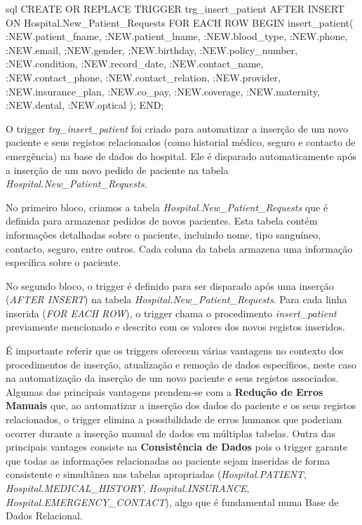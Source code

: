 \begin{myminted}{sql}
CREATE OR REPLACE TRIGGER trg_insert_patient
AFTER INSERT ON Hospital.New_Patient_Requests
FOR EACH ROW
BEGIN
    insert_patient(
        :NEW.patient_fname,
        :NEW.patient_lname,
        :NEW.blood_type,
        :NEW.phone,
        :NEW.email,
        :NEW.gender,
        :NEW.birthday,
        :NEW.policy_number,
        :NEW.condition,
        :NEW.record_date,
        :NEW.contact_name,
        :NEW.contact_phone,
        :NEW.contact_relation,
        :NEW.provider,
        :NEW.insurance_plan,
        :NEW.co_pay,
        :NEW.coverage,
        :NEW.maternity,
        :NEW.dental,
        :NEW.optical
    );
END;
\end{myminted}

O trigger \textit{trg\_insert\_patient} foi criado para automatizar a inserção de um novo paciente e seus registos relacionados (como historial médico, seguro e contacto de emergência) na base de dados do hospital. Ele é disparado automaticamente após a inserção de um novo pedido de paciente na tabela \textit{Hospital.New\_Patient\_Requests}.

No primeiro bloco, criamos a tabela \textit{Hospital.New\_Patient\_Requests} que é definida para armazenar pedidos de novos pacientes. Esta tabela contém informações detalhadas sobre o paciente, incluindo nome, tipo sanguíneo, contacto, seguro, entre outros. Cada coluna da tabela armazena uma informação específica sobre o paciente.

No segundo bloco, o trigger é definido para ser disparado após uma inserção (\textit{AFTER INSERT}) na tabela \textit{Hospital.New\_Patient\_Requests}. Para cada linha inserida (\textit{FOR EACH ROW}), o trigger chama o procedimento \textit{insert\_patient} previamente mencionado e descrito com os valores dos novos registos inseridos.

É importante referir que os triggers oferecem várias vantagens no contexto dos procedimentos de inserção, atualização e remoção de dados específicos, neste caso na automatização da inserção de um novo paciente e seus registos associados. Algumas das principais vantagens prendem-se com a \textbf{Redução de Erros Manuais} que, ao automatizar a inserção dos dados do paciente e os seus registos relacionados, o trigger elimina a possibilidade de erros humanos que poderiam ocorrer durante a inserção manual de dados em múltiplas tabelas. Outra das principais vantages consiste na \textbf{Consistência de Dados} pois o trigger garante que todas as informações relacionadas ao paciente sejam inseridas de forma consistente e simultânea nas tabelas apropriadas (\textit{Hospital.PATIENT}, \textit{Hospital.MEDICAL\_HISTORY}, \textit{Hospital.INSURANCE}, \textit{Hospital.EMERGENCY\_CONTACT}), algo que é fundamental numa Base de Dados Relacional.

